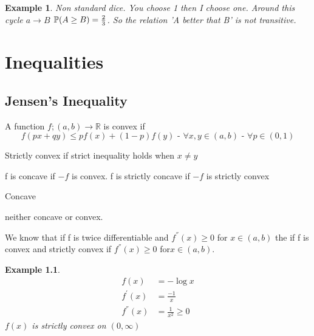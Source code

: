 \documentclass{notes}
\theoremstyle{plain}
\newtheorem*{example}{Example}
\newcommand{\bP}{\mathbb{P}}
\newcommand{\bR}{\mathbb{R}}
\newcommand{\prob}[1]{\bP \negthinspace\left(#1\right)}
\begin{document}
\begin{example} Non standard dice. \hfill
You choose 1 then I choose one.
\vspace{3in}
Around this cycle $a \to B$ $\prob{A \ge B} =\frac{2}{3}$.\hfill
  So the relation  'A better that B' is not transitive.
\end{example}
\chapter{Inequalities}
\section{Jensen's Inequality}
A function $ f;(a,b) \to \bR$ is convex if
\[
f(px + qy) \leq pf(x) + (1-p)f(y) \text{ - } \forall x,y \in (a,b) 
\text{ - } \forall p \in(0,1)
\]

Strictly convex if strict inequality holds when $x \neq y$

\vspace{3in}

f is concave if $-f$ is convex.  f is strictly concave if $-f$ is strictly
convex

\vspace{3in}

Concave

\vspace{3in}

neither concave or convex.\hfill

We know that if f is twice differentiable and $f^{''}(x) \geq 0$ for $x \in 
(a,b)$ the if f is convex and strictly convex if $f^{''}(x) \ge 0$ for$x \in 
(a,b)$.
\begin{example}
\begin{align*}
f(x) &= - \log x\\
f^{'}(x) &= \frac{-1}{x}\\
f^{''}(x) &= \frac{1}{x^2} \ge 0
\end{align*}
$f(x)$ is strictly convex on $(0,\infty)$
\end{example}
\end{document}
